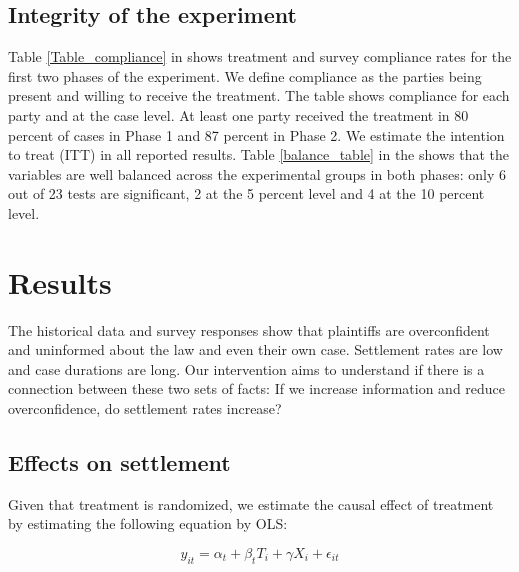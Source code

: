 \documentclass[11pt, a4paper]{article}
\begin{document}
\subsection{Integrity of the experiment}

 Table \ref{Table_compliance} in  shows treatment and survey compliance rates for the first two phases of the experiment. We define compliance as the parties being present and willing to receive the treatment. The table shows compliance for each party and at the case level. At least one party received the treatment in 80 percent of cases in Phase 1 and 87 percent in Phase 2. We estimate the intention to treat (ITT) in all reported results. Table \ref{balance_table} in the  shows that the variables are well balanced across the experimental groups in both phases: only 6 out of 23 tests are significant, 2 at the 5 percent level and 4 at the 10 percent level. 

\section{Results} \label{ResultsSection}

The historical data and survey responses show that plaintiffs are overconfident and uninformed about the law and even their own case. Settlement rates are low and case durations are long. Our intervention aims to understand if there is a connection between these two sets of facts: If we increase information and reduce overconfidence, do settlement rates increase? 


\subsection{Effects on settlement}

Given that treatment is randomized, we estimate the causal effect of treatment by estimating the following equation by OLS:

\begin{equation}
   y_{it} = \alpha_t + \beta_{t} T_{i} + \gamma \textbf{$X_i$} + \epsilon_{it} 
\end{equation}
\end{document}
